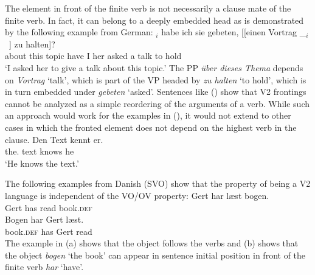\zl
\eal
{}
\zl
\eal
{}
\zl

The element in front of the finite verb is not necessarily a clause mate of the finite verb. In
fact, it can belong to a deeply embedded head as is demonstrated by the following example from
German:
\ea
{}$_i$ habe ich sie gebeten, [[einen Vortrag \_$_i$~] zu halten]?\footnotemark\\
     \spacebr{}about this topic  have I her asked \hphantom{[[}a talk {} to hold\\\german
{}
\glt `I asked her to give a talk about this topic.'
\z
The PP \emph{über dieses Thema} depends on \emph{Vortrag} `talk', which is part of the VP headed by
\emph{zu halten} `to hold', which is in turn embedded under \emph{gebeten} `asked'. Sentences like
() show that V2 frontings cannot be analyzed as a simple reordering of the arguments of a
verb. While such an approach would work for the examples in (), it would not extend to other
cases in which the fronted element does not depend on the highest verb in the clause.
\ea
\gll Den Text kennt er.\\
     the.\ACC{} text knows he\\
\glt `He knows the text.'
\z

The following examples from Danish (SVO) show that the property of being a V2
language is independent of the VO/OV property:
\eal
\ex 
\gll Gert har læst bogen.\\
     Gert has read book.\textsc{def}\\\danish
\ex
\gll Bogen har Gert læst.\\
     book.\textsc{def} has Gert read\\
\zl
The example in (a) shows that the object follows the verbs and (b) shows that the
object \emph{bogen} `the book' can appear in sentence initial position in front of the finite verb
\emph{har} `have'.

